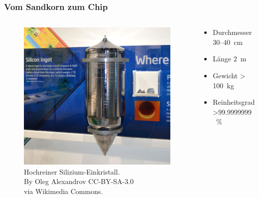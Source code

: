 \begin{frame}
	\frametitle{Vom Sandkorn zum Chip}
	\begin{columns}[onlytextwidth]
		\begin{column}{0.6\textwidth}
			\begin{figure}
				\centering
				\includegraphics[width=.6\textwidth]{images/Siligon_ingot_at_Intel_Museum.jpeg}

				\caption{Hochreiner Silizium-Einkristall.\\
					By Oleg Alexandrov CC-BY-SA-3.0\\
					via Wikimedia Commons.}
			\end{figure}
		\end{column}
		\begin{column}{0.45\textwidth}
			\begin{itemize}
				\item Durchmesser 30--\SI{40}{\centi\meter}
				\item Länge \SI{2}{\meter}
				\item Gewicht \SI{> 100}{\kilo\gram}
				\item Reinheitsgrad \SI{>99.9999999}{\percent}
			\end{itemize}
		\end{column}
	\end{columns}
\end{frame}

